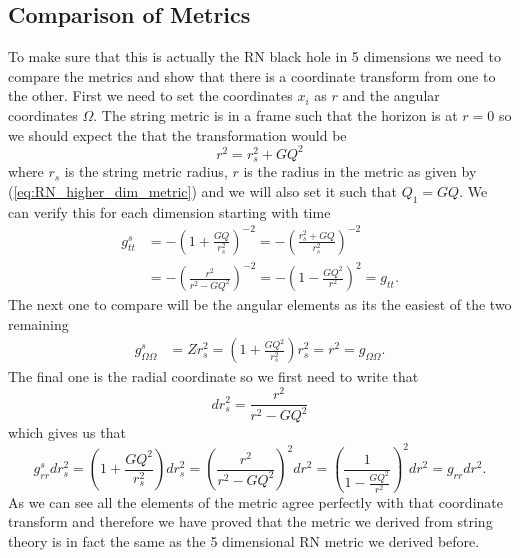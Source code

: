 \documentclass[12pt]{article}
\numberwithin{equation}{section}
\numberwithin{figure}{section}
\begin{document}
\subsection{Comparison of Metrics} %
\label{sub:comparison_of_metrics}
To make sure that this is actually the RN black hole in 5 dimensions we need to compare the metrics and show that there is a coordinate transform from one to the other. First we need to set the coordinates $x_{i}$ as $r$ and the angular coordinates $\Omega$. The string metric is in a frame such that the horizon is at $r=0$ so we should expect the that the transformation would be 
\begin{equation}
	r^{2}=r^{2}_{s}+GQ^{2}
\end{equation}
where $r_{s}$ is the string metric radius, $r$ is the radius in the metric as given by (\ref{eq:RN_higher_dim_metric}) and we will also set it such that $Q_{1}=GQ$. We can verify this for each dimension starting with time 
\begin{align}
	g_{tt}^{s}&=-\left(1+\frac{GQ}{r_{s}^{2}}\right)^{-2}=-\left(\frac{r_{s}^{2}+GQ}{r_{s}^{2}}\right)^{-2}\\
	&=-\left(\frac{r^{2}}{r^{2}-GQ^{2}}\right)^{-2}=-\left(1-\frac{GQ^{2}}{r^{2}}\right)^{2}=g_{tt}.
\end{align}
The next one to compare will be the angular elements as its the easiest of the two remaining
\begin{align}
	g_{\Omega\Omega}^{s}&=Zr^{2}_{s}=\left(1+ \frac{GQ^{2}}{r^{2}_{s}}\right)r^{2}_{s}=r^{2}=g_{\Omega\Omega}.
\end{align}
The final one is the radial coordinate so we first need to write that
\begin{equation}
	dr_{s}^{2}=\frac{r^{2}}{r^{2}-GQ^{2}}
\end{equation}
which gives us that
\begin{equation}
	g_{rr}^{s}dr^{2}_{s}=\left(1+\frac{GQ^{2}}{r^{2}_{s}}\right)dr_{s}^{2}=\left(\frac{r^{2}}{r^{2}-GQ^{2}}\right)^{2}dr^{2}=\left(\frac{1}{1- \frac{GQ^{2}}{r^{2}}}\right)^{2}dr^{2}=g_{rr}dr^{2}.
\end{equation}
As we can see all the elements of the metric agree perfectly with that coordinate transform and therefore we have proved that the metric we derived from string theory is in fact the same as the 5 dimensional RN metric we derived before. 
\end{document}
